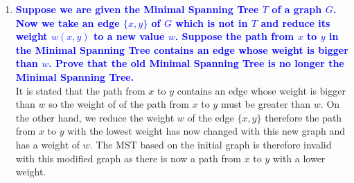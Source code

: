 \documentclass[11pt]{article}
\begin{document}
\begin{enumerate}
\item \textbf{\textcolor{blue}{Suppose we are given the Minimal Spanning Tree $T$ of a graph $G$.  Now we take an edge $\{x,y\}$ of $G$ which is not in $T$ and reduce its weight $w(x,y)$ to a new value $w$.  Suppose the path from $x$ to $y$ in the Minimal Spanning Tree contains an edge whose weight is bigger than $w$.  Prove that the old Minimal Spanning Tree is no longer the Minimal Spanning Tree.}}
    \\ It is stated that the path from $x$ to $y$ contains an edge whose weight is bigger than $w$ so the weight of of the path from $x$ to $y$ must be greater than $w$. On the other hand, we reduce the weight $w$ of the edge $\{x,y\}$ therefore the path from $x$ to $y$ with the lowest weight has now changed with this new graph and has a weight of $w$. The MST based on the initial graph is therefore invalid with this modified graph as there is now a path from $x$ to $y$ with a lower weight.
    

\end{enumerate}
\end{document}
